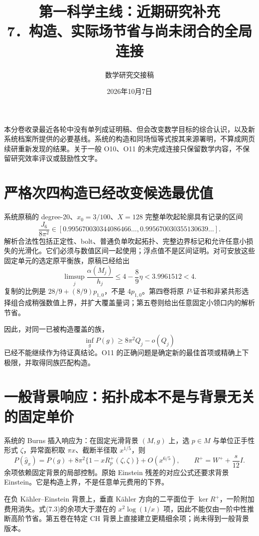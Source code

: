 \documentclass[UTF8,11pt,fontset=none]{ctexart}
\title{第一科学主线：近期研究补充\\[6pt]\large 7．构造、实际场节省与尚未闭合的全局连接}
\author{数学研究交接稿}\date{2026年10月7日}
\theoremstyle{definition}
\theoremstyle{remark}
\begin{document}
\maketitle
\tableofcontents
\clearpage
本分卷收录最近各轮中没有单列成证明稿、但会改变数学目标的综合认识，以及新系统档案所提供的必要基线。系统的构造和同场恒等式按其来源署明，不算成网页续研重新发现的结果。关于一般 O10、O11 的未完成连接只保留数学内容，不保留研究效率评议或鼓励性文字。\cite{B01,B02,B03}

\section{严格次四构造已经改变候选最优值}\label{v7-ux4e25ux683cux6b21ux56dbux6784ux9020ux5df2ux7ecfux6539ux53d8ux5019ux9009ux6700ux4f18ux503c}

系统原稿的 degree-20、\(x_0=3/100\)、\(X=128\) 完整单吹起轮廓具有记录的区间 \[
 \frac{J_6}{8\pi^2}\in
 [0.995670030344086466\ldots,
  0.995670030355130639\ldots].
\tag{7.1}
\] 解析合法性包括正定性、bolt、普通负单吹起拓扑、完整边界标记和允许任意小损失的光滑化。它们必须与数值区间一起使用；浮点值不是区间证明。对可安放这些固定单元的选定原平衡族，原稿已经给出 \[
 \limsup_j\frac{\alpha(M_j)}{h_j}
 \le4-\frac89\eta<3.9961512<4.
\tag{7.2}
\] 复制的比例是 \(28/9+(8/9)p_{1,0}\)，不是 \(4p_{1,0}\)。第四卷将原 \(P\)-证书和非紧共形选择组合成稍强数值上界，并扩大覆盖量词；第五卷则给出任意固定小领口内的解析节省。

因此，对同一已被构造覆盖的族， \[
 \inf_gP(g)\ge8\pi^2Q_j-o(Q_j)
\] 已经不能继续作为待证真结论。O11 的正确问题是确定新的最佳首项或精确上下极限，并取得同族匹配构造。

\section{一般背景响应：拓扑成本不是与背景无关的固定单价}\label{v7-ux4e00ux822cux80ccux666fux54cdux5e94ux62d3ux6251ux6210ux672cux4e0dux662fux4e0eux80ccux666fux65e0ux5173ux7684ux56faux5b9aux5355ux4ef7}

系统的 Burns 插入响应为：在固定光滑背景 \((M,g)\) 上，选 \(p\in M\) 与单位正手性形式 \(\zeta\)，异常面积取 \(\pi x\)、截断半径取 \(x^{1/5}\)，则 \[
 P(\widehat g_x)=P(g)+8\pi^2\{1-xR_p^+(\zeta,\zeta)\}+O(x^{6/5}),
 \qquad R^+=W^++\frac{s}{12}I.
\tag{7.3}
\] 余项依赖固定背景的局部控制。原始 Einstein 残差的对应公式还要求背景 Einstein。它是构造上界，不是任意单元费用的下界。

在负 Kähler--Einstein 背景上，垂直 Kähler 方向的二平面位于 \(\ker R^+\)，一阶附加费用消失。式(7.3)的余项大于潜在的 \(x^2\log(1/x)\) 项，因此不能仅由一阶中性推断高阶节省。第五卷在特定 CH 背景上直接建立更精细余项；尚未得到一般背景版本。\cite{B01}
\end{document}
